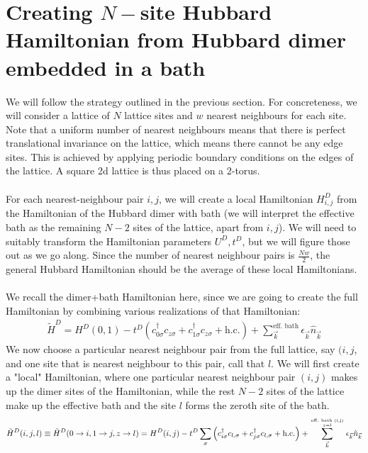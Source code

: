 \documentclass{report}
\numberwithin{equation}{section}
\begin{document}
\section{Creating \(N-\)site Hubbard Hamiltonian from Hubbard dimer embedded in a bath}
We will follow the strategy outlined in the previous section. For concreteness, we will consider a lattice of \(N\) lattice sites and \(w\) nearest neighbours for each site. Note that a uniform number of nearest neighbours means that there is perfect translational invariance on the lattice, which means there cannot be any edge sites. This is achieved by applying periodic boundary conditions on the edges of the lattice. A square 2d lattice is thus placed on a 2-torus.
\\\\
For each nearest-neighbour pair \(i,j\), we will create a local Hamiltonian \(H^D_{i,j}\) from the Hamiltonian of the Hubbard dimer with bath (we will interpret the effective bath as the remaining \(N-2\) sites of the lattice, apart from \(i,j\)). We will need to suitably transform the Hamiltonian parameters \(U^D, t^D\), but we will figure those out as we go along. Since the number of nearest neighbour pairs is \(\frac{Nw}{2}\), the general Hubbard Hamiltonian should be the average of these local Hamiltonians. 
\\\\
We recall the dimer+bath Hamiltonian here, since we are going to create the full Hamiltonian by combining various realizations of that Hamiltonian:
\begin{equation}\begin{aligned}
	\tilde H^D = H^D(0,1) - t^D \left(c^\dagger_{0\sigma}c_{z\sigma} + c^\dagger_{1\sigma}c_{z\sigma} + \text{h.c.}\right) + \sum_{\vec k}^\text{eff. bath}\epsilon_{\vec k}\hat n_{\vec k}
\end{aligned}\end{equation}
We now choose a particular nearest neighbour pair from the full lattice, say \((i,j\), and one site that is nearest neighbour to this pair, call that \(l\). We will first create a "local" Hamiltonian, where one particular nearest neighbour pair \((i,j)\) makes up the dimer sites of the Hamiltonian, while the rest \(N-2\) sites of the lattice make up the effective bath and the site \(l\) forms the zeroth site of the bath.
\begin{equation}\begin{aligned}
	\label{Hdjl}
	\tilde H^D(i, j, l) \equiv \tilde H^D(0\to i, 1\to j, z \to l) = H^D(i, j) - t^D \sum_{\sigma}\left(c^\dagger_{i\sigma}c_{l,\sigma} + c^\dagger_{j\sigma}c_{l,\sigma} + \text{h.c.}\right) + \sum_{\vec k}^{\text{eff. bath (i,j)}\atop{z = l}}\epsilon_{\vec k}\hat n_{\vec k}\\
\end{aligned}\end{equation}
\end{document}
